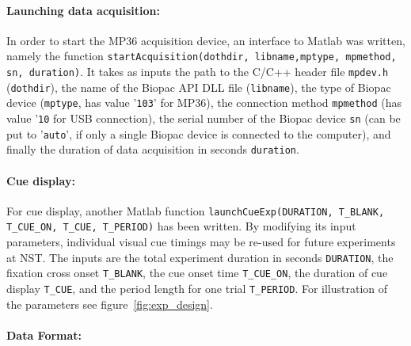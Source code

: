 \documentclass[a4paper,oneside, openright,12pt]{report}
\begin{document}
\paragraph{Launching data acquisition:} In order to start the MP36 acquisition device, an interface to Matlab was written, namely the function \texttt{startAcquisition(dothdir, libname,mptype, mpmethod, sn, duration)}. It takes as inputs the path to the C/C++ header file \texttt{mpdev.h} (\texttt{dothdir}), the name of the Biopac API DLL file (\texttt{libname}), the type of Biopac device (\texttt{mptype}, has value '\texttt{103}' for MP36), the connection method \texttt{mpmethod} (has value '\texttt{10} for USB connection), the serial number of the Biopac device \texttt{sn} (can be put to '\texttt{auto}', if only a single Biopac device is connected to the computer), and finally the duration of data acquisition in seconds \texttt{duration}. 

\paragraph{Cue display:} For cue display, another Matlab function \texttt{launchCueExp(DURATION, T\_BLANK, T\_CUE\_ON, T\_CUE, T\_PERIOD)} has been written. By modifying its input parameters, individual visual cue timings may be re-used for future experiments at NST. The inputs are the total experiment duration in seconds \texttt{DURATION}, the fixation cross onset \texttt{T\_BLANK}, the cue onset time \texttt{T\_CUE\_ON}, the duration of cue display \texttt{T\_CUE}, and the period length for one trial \texttt{T\_PERIOD}. For illustration of the parameters see figure~\ref{fig:exp_design}.

\paragraph{Data Format:}
\end{document}
